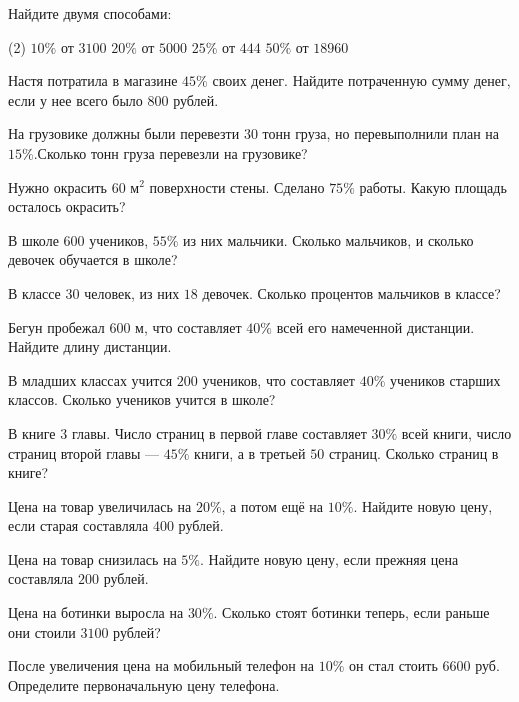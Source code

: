 \begin{homework}[number=1]
	\begin{listofex}
		\item Найдите двумя способами:
		\begin{tasks}(2)
			\task \( 10\% \) от \( 3100 \)
			\task \( 20\% \) от \( 5000 \)
			\task \( 25\% \) от \( 444 \)
			\task \( 50\% \) от \( 18960 \)
		\end{tasks}
		\item Настя потратила в магазине \( 45\% \) своих денег. Найдите потраченную сумму денег, если у нее всего было \( 800  \) рублей.
		\item На грузовике должны были перевезти \( 30 \) тонн груза, но перевыполнили план на \( 15\% \).Сколько тонн груза перевезли на грузовике?
		\item Нужно окрасить \( 60 \) м\( ^2 \) поверхности стены. Сделано \( 75\% \) работы. Какую площадь осталось окрасить?
		\item В школе \( 600 \) учеников, \( 55\% \) из них мальчики. Сколько мальчиков, и сколько девочек обучается в школе?
		\item {}
	\end{listofex}
\end{homework}

\begin{class}[number=3]
	\begin{listofex}
		\item В классе \( 30 \) человек, из них \( 18 \) девочек. Сколько процентов мальчиков в классе?
		\item Бегун пробежал \( 600 \) м, что составляет \( 40\% \) всей его намеченной дистанции. Найдите длину дистанции.
		\item В младших классах учится \( 200 \) учеников, что составляет \( 40\% \) учеников старших классов. Сколько учеников учится в школе?
		\item В книге \( 3 \) главы. Число страниц в первой главе составляет \( 30\% \) всей книги, число страниц второй главы --- \( 45\% \) книги, а в третьей \( 50 \) страниц. Сколько страниц в книге?
		\item  Цена на товар увеличилась на \( 20\% \), а потом ещё на \( 10\% \). Найдите новую цену, если старая составляла \( 400 \) рублей.
		\item  Цена на товар снизилась на \( 5\% \). Найдите новую цену, если прежняя цена составляла \( 200 \) рублей.
		\item Цена на ботинки выросла на \( 30\% \). Сколько стоят ботинки теперь, если раньше они стоили \( 3100 \) рублей?
		\item После увеличения цена на мобильный телефон на \( 10\% \) он стал стоить \( 6600 \) руб. Определите первоначальную цену телефона.
	\end{listofex}
\end{class}

